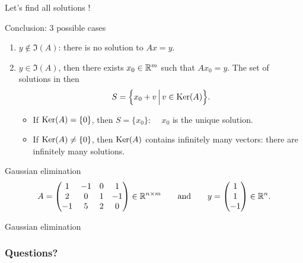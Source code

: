 \documentclass{beamer}
\begin{document}
\begin{frame}[t]{Let's find all solutions !}
	\grid

\end{frame}
\begin{frame}[t]{Conclusion: 3 possible cases}
	\grid

	\begin{enumerate}
		\item $y \not \in \Im(A)$: there is no solution to $Ax = y$.
			\vspace{0.4cm}
		\item $y \in \Im(A)$, then there exists $x_0 \in \mathbb{R}^m$ such that $Ax_0 =y$. The set of solutions in then
			$$
			S = \Big\{ x_0 + v \, \Big| \, v \in {{\rm Ker}}(A) \Big\}.
			$$
			\begin{itemize}
				\item If ${{\rm Ker}}(A) = \{ 0 \}$, then $S = \{x_0\}$: \ \ $x_0$ is the unique solution.
			\vspace{0.4cm}
				\item If ${{\rm Ker}}(A) \neq \{ 0 \}$, then ${{\rm Ker}}(A)$ contains infinitely many vectors: there are infinitely many solutions.
			\end{itemize}
	\end{enumerate}

\end{frame}


\begin{frame}[t]{Gaussian elimination}
	\grid
	$$
	A = 
	\begin{pmatrix}
		1  & -1 & 0 & 1 \\
		2  & 0 & 1 & -1 \\
		-1  & 5 & 2 & 0 
	\end{pmatrix} \in \mathbb{R}^{n \times m}
	\qquad \text{and} \qquad
	y = 
	\begin{pmatrix}
		1 \\
		1 \\
		-1
	\end{pmatrix}
	\in \mathbb{R}^n.
	$$

\end{frame}
\begin{frame}[t]{Gaussian elimination}
	\grid
	\pause
	\pause
\end{frame}
\appendix
\backupbegin
\begin{frame}[t]
	\frametitle{Questions?}
	\grid
	\pause
	\pause
\end{frame}
\backupend
\end{document}
